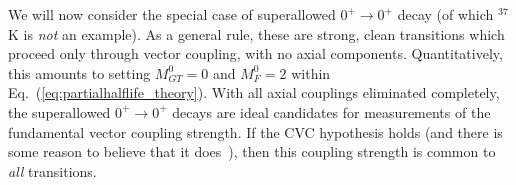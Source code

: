 

We will now consider the special case of superallowed $0^+ \rightarrow 0^+$ decay (of which $^{37}$K is \emph{not} an example).  As a general rule, these are strong, clean transitions which proceed only through vector coupling, with no axial components.  Quantitatively, this amounts to setting $M_{GT}^0=0$ and $M_F^0=2$ within Eq.~(\ref{eq:partialhalflife_theory}).  With all axial couplings eliminated completely, the superallowed $0^+ \rightarrow 0^+$ decays are
ideal candidates for measurements of the fundamental vector coupling strength.
If the \ac{CVC} hypothesis holds (and there is some reason to believe that it does~\cite{severijns2006}\cite{HardyTownerSuperallowed2020}), then this coupling strength is common to \emph{all} transitions.




